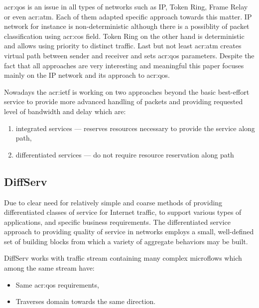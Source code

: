 \documentclass[11pt]{book}
\begin{document}
      \gls{acr:qos} is an issue in all types of networks such as IP, Token Ring, Frame Relay or even \gls{acr:atm}.
      Each of them adapted specific approach towards this matter. IP network for instance is non-deterministic although
      there is a possiblity of packet classification using \gls{acr:cos} field. Token Ring on the other hand is
      deterministic and allows using priority to distinct traffic. Last but not least \gls{acr:atm} creates virtual path
      between sender and receiver and sets \gls{acr:qos} parameters. Despite the fact that all approaches are very
      interesting and meaningful this paper focuses mainly on the IP network and its approach to \gls{acr:qos}.


      Nowadays the \gls{acr:ietf} is working on two approaches beyond the basic best-effort
      service to provide more advanced handling of packets and providing requested level of bandwidth and delay which
      are:

      \begin{enumerate}
        \item integrated services --- reserves resources necessary to provide the service along path,
        \item differentiated services --- do not require resource reservation along path
      \end{enumerate}


      \subsection{DiffServ}

        Due to clear need for relatively simple and coarse methods of providing differentiated classes of service for
        Internet traffic, to support various types of applications, and specific business requirements. The
        differentiated service approach to providing quality of service in networks employs a small, well-defined set of
        building blocks from which a variety of aggregate behaviors may be built. \cite{qos}

        DiffServ works with traffic stream containing many complex microflows which among the same stream have:

        \begin{itemize}
          \item Same \gls{acr:qos} requirements,
          \item Traverses domain towards the same direction.
        \end{itemize}
\end{document}
